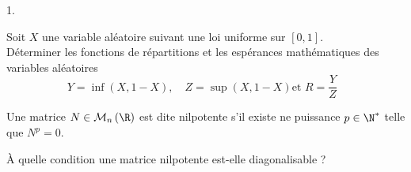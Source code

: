 \documentclass[11pt]{article}%
\begin{document}
\begin{noliste}{1.}
\item Soit $X$ une variable aléatoire suivant une loi uniforme sur
  $\left[ 0,1\right]$.\\
  Déterminer les fonctions de répartitions et les espérances
  mathématiques des variables aléatoires
  \[
  Y=\inf \left( X,1-X\right) ,\quad Z=\sup \left( X,1-X\right) \text{
    et }R = \frac{Y}{Z}\text{ }
  \]

\item Une matrice $N\in \mathcal{M}_{n}\left( \R\right) $ est dite
  nilpotente s'il existe ne puissance $p\in \N^{\ast }$ telle que
  $N^{p}=0$.

  À quelle condition une matrice nilpotente est-elle diagonalisable ?



\end{noliste}

\end{document}
